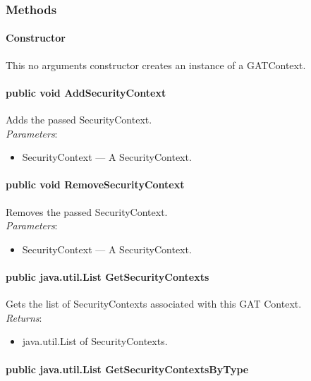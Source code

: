 \documentclass[$Date: 2003/06/26 19:29:31 $]{glabarticle}
\begin{document}

\subsubsection{Methods}

\paragraph{Constructor}

This no arguments constructor creates an instance of a GATContext.

\paragraph{public void AddSecurityContext}

Adds the passed SecurityContext.\\

\textit{Parameters}:
\begin{itemize}
\item[] SecurityContext --- A SecurityContext.
\end{itemize}

\paragraph{public void RemoveSecurityContext}

Removes the passed SecurityContext.\\

\textit{Parameters}:
\begin{itemize}
\item[] SecurityContext --- A SecurityContext.
\end{itemize}

\paragraph{public java.util.List GetSecurityContexts}

Gets the list of SecurityContexts associated with this GAT Context.\\

\textit{Returns}:
\begin{itemize}
\item[] java.util.List of SecurityContexts.
\end{itemize}

\paragraph{public java.util.List GetSecurityContextsByType}
\end{document}
